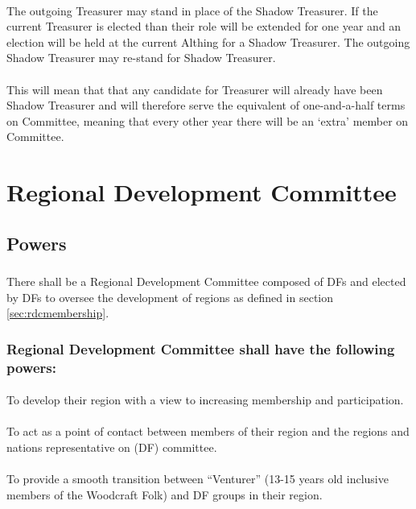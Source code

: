 \documentclass[a4paper, 12pt]{article}
\begin{document}
\paragraph{}
The outgoing Treasurer may stand in place of the Shadow Treasurer. If the current Treasurer is elected than their role will be extended for one year and an election will be held at the current Althing for a Shadow Treasurer. The outgoing Shadow Treasurer may re-stand for Shadow Treasurer.
\paragraph{}
This will mean that that any candidate for Treasurer will already have been Shadow Treasurer and will therefore serve the equivalent of one-and-a-half terms on Committee, meaning that every other year there will be an `extra' member on Committee.

\section{Regional Development Committee}
\subsection{Powers}
\subsubsection{}
There shall be a Regional Development Committee composed of DFs and elected by DFs to oversee the development of regions as defined in section \ref{sec:rdcmembership}.
\subsubsection{Regional Development Committee shall have the following powers:}
\paragraph{}
To develop their region with a view to increasing membership and participation.
\paragraph{}
To act as a point of contact between members of their region and the regions and nations representative on (DF) committee.
\paragraph{}
To provide a smooth transition between ``Venturer'' (13-15 years old inclusive members of the Woodcraft Folk) and DF groups in their region.
\end{document}
